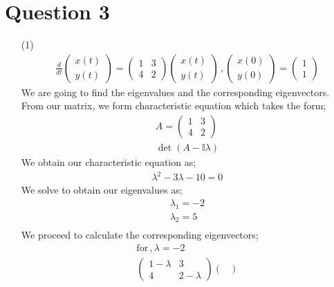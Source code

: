 \documentclass[12pt,a4paper]{article}
\begin{document}
\section*{Question 3}
\begin{enumerate}
\item[(1)]
\begin{eqnarray*}
\frac{d}{dt} \begin{pmatrix}
x(t)\\
y(t) 
\end{pmatrix}= \begin{pmatrix}
1 & 3 \\
4 & 2 
\end{pmatrix} \begin{pmatrix}
x(t)\\
y(t) 
\end{pmatrix}\, , \begin{pmatrix}
x(0)\\
y(0) 
\end{pmatrix} =\begin{pmatrix}
1\\
1
\end{pmatrix}
\end{eqnarray*} 
We are going to find the eigenvalues and the corresponding eigenvectors.\\
From our matrix, we form characteristic equation which takes the form;
\begin{eqnarray*}
A=\begin{pmatrix}
1 & 3\\
4& 2
\end{pmatrix}\\
\det (A-\mathbb{I} \lambda)
\end{eqnarray*} 
We obtain our characteristic equation as;
\begin{eqnarray*}
\lambda^2-3\lambda-10 =0
\end{eqnarray*}
We solve to obtain our eigenvalues as;
\begin{eqnarray*}
\lambda_1=-2\\
\lambda_2=5\\
\end{eqnarray*}
We proceed to calculate the corresponding eigenvectors;
\begin{eqnarray*}
\text{for}\,, \lambda=-2\\
\begin{pmatrix}
1-\lambda & 3\\
4 & 2-\lambda 
\end{pmatrix}
\begin{pmatrix}

\end{pmatrix}
\end{eqnarray*}
\end{enumerate}
\end{document}
